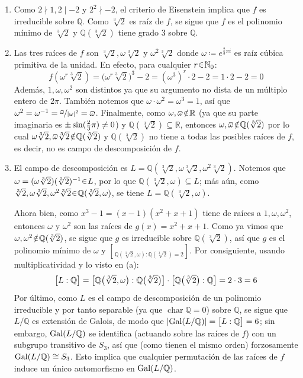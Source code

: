 \begin{sol}\hphantom{x}
\begin{enumerate}[label=\alph*)]
\item 
Como $2\nmid 1, 2\mid-2$ y $2^2\nmid -2$, el criterio de Eisenstein implica que $f$ es irreducible sobre $\mathbb{Q}$. Como $\sqrt[3]{2}$ es raíz de $f$, se sigue que $f$ es el polinomio mínimo de $\sqrt[3]{2}$ y $\mathbb{Q}(\sqrt[3]{2})$ tiene grado $3$ sobre $\mathbb{Q}$.

\item 
Las tres raíces de $f$ son $\sqrt[3]{2}, \omega\sqrt[3]{2}$ y $\omega^2\sqrt[3]{2}$ donde $\omega \coloneq e^{\frac23\pi i}$ es raíz cúbica primitiva de la unidad. En efecto, para cualquier $r\en\mathbb{N}_0$:
\[
f(\omega^r\sqrt[3]{2}) = \big(\omega^r\sqrt[3]{2}\big)^3-2 = (\omega^3)^r\cdot2 -2 = 1\cdot2 - 2 = 0
\]
Además, $1,\omega,\omega^2$ son distintos ya que su argumento no dista de un múltiplo entero de $2\pi$. También notemos que $\omega\cdot\omega^2 = \omega^3 = 1$, así que $\omega^2=\omega^{-1} = \nicefrac{\ubar{\omega}}{\abs{\omega}^2}= \ubar\omega$. Finalmente, como $\omega,\ubar\omega\noten\mathbb{R}$ (ya que su parte imaginaria es $\pm\sin(\smash{\frac23\pi}) \neq 0$) y $\mathbb{Q}(\sqrt[3]{2}) \subseteq \mathbb{R}$, entonces $\omega,\ubar\omega \noten \mathbb{Q}(\sqrt[3]{2})$ por lo cual $\omega\sqrt[3]{2},\ubar{\omega}\sqrt[3]{2} \noten \mathbb{Q}(\sqrt[3]{2})$ y $\mathbb{Q}(\sqrt[3]{2})$ no tiene a todas las posibles raíces de $f$, es decir, no es campo de descomposición de $f$.

\item 
El campo de descomposición es $L = \mathbb{Q}(\sqrt[3]{2},\omega\sqrt[3]{2},\omega^2\sqrt[3]{2})$. Notemos que $\omega = (\omega\sqrt[3]{2})(\sqrt[3]{2})^{-1} \en L$, por lo que $\mathbb{Q}(\sqrt[3]{2},\omega) \subseteq L$; más aún, como $\sqrt[3]{2},\omega\sqrt[3]{2},\omega^2\sqrt[3]{2} \en \mathbb{Q}(\sqrt[3]{2},\omega)$, se tiene $L = \mathbb{Q}(\sqrt[3]{2},\omega)$.\par
Ahora bien, como $x^3-1 = (x-1)(x^2+x+1)$ tiene de raíces a $1,\omega,\omega^2$, entonces $\omega$ y $\omega^2$ son las raíces de $g(x)=x^2+x+1$. Como ya vimos que $\omega,\omega^2 \noten\mathbb{Q}(\sqrt[3]{2})$, se sigue que $g$ es irreducible sobre $\mathbb{Q}(\sqrt[3]{2})$, así que $g$ es el polinomio mínimo de $\omega$ y $\brack{\mathbb{Q}(\sqrt[3]{2},\omega):\mathbb{Q}(\sqrt[3]{2})} = 2$. Por consiguiente, usando multiplicatividad y lo visto en (a):
\[
\brack[\big]{L:\mathbb{Q}}%
= \brack[\big]{\mathbb{Q}\big(\sqrt[3]{2},\omega\big):\mathbb{Q}\big(\sqrt[3]{2}\big)} \cdot \brack[\big]{\mathbb{Q}\big(\sqrt[3]{2}\big):\mathbb{Q}}%
=2 \cdot 3 = 6
\]
Por último, como $L$ es el campo de descomposición de un polinomio irreducible y por tanto separable (ya que $\operatorname{char}\mathbb{Q} =0$) sobre $\mathbb{Q}$, se sigue que $L/\mathbb{Q}$ es extensión de Galois, de modo que $\abs{\gal(L/\mathbb{Q})} = \brack[\big]{L:\mathbb{Q}} = 6$; sin embargo, $\gal(L/\mathbb{Q})$ se identifica (actuando sobre las raíces de $f$) con un subgrupo transitivo de $S_3$, así que (como tienen el mismo orden) forzosamente $\gal(L/\mathbb{Q}) \cong S_3$. Esto implica que cualquier permutación de las raíces de $f$ induce un único automorfismo en $\gal(L/\mathbb{Q})$.


\end{enumerate}
\end{sol}
